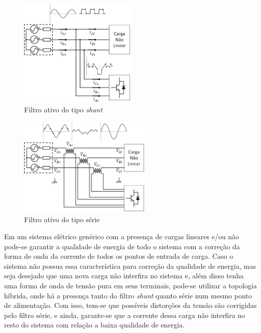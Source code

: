 \begin{figure}[!htbp]
	\centering
	\includegraphics[width=0.5\textwidth]{Cap2/Figuras/shunt.png}
	\caption{Filtro ativo do tipo \textit{shunt}}
	\label{fig:shunt}
\end{figure}

\begin{figure}[!htbp] %
	\centering
	\includegraphics[width=0.567\textwidth]{Cap2/Figuras/serie.png}
	\caption{Filtro ativo do tipo série}
	\label{fig:serie}
\end{figure}

Em um sistema elétrico genérico com a presença de cargas lineares e/ou não pode-se garantir a qualidade de energia de todo o sistema com a correção da forma de onda da corrente de todos os pontos de entrada de carga. Caso o sistema não possua essa característica para correção da qualidade de energia, mas seja desejado que uma nova carga não interfira no sistema e, além disso tenha uma forma de onda de tensão pura em seus terminais, pode-se utilizar a topologia híbrida, onde há a presença tanto do filtro \textit{shunt} quanto série num mesmo ponto de alimentação. Com isso, tem-se que possíveis distorções da tensão são corrigidas pelo filtro série, e ainda, garante-se que a corrente dessa carga não interfira no resto do sistema com relação a baixa qualidade de energia.

